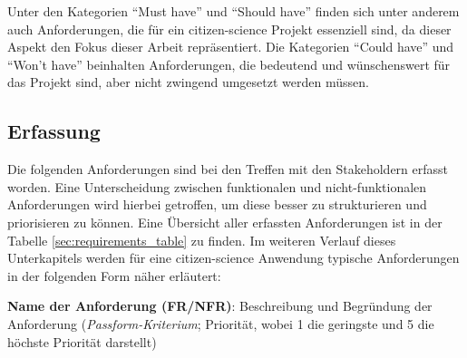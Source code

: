 Unter den Kategorien \enquote{Must have} und \enquote{Should have} finden sich unter anderem auch Anforderungen, die für ein citizen-science Projekt essenziell sind, da dieser Aspekt den Fokus dieser Arbeit repräsentiert. Die Kategorien \enquote{Could have} und \enquote{Won't have} beinhalten Anforderungen, die bedeutend und wünschenswert für das Projekt sind, aber nicht zwingend umgesetzt werden müssen. 

\subsection{Erfassung}
Die folgenden Anforderungen sind bei den Treffen mit den Stakeholdern erfasst worden. Eine Unterscheidung zwischen funktionalen und nicht-funktionalen Anforderungen wird hierbei getroffen, um diese besser zu strukturieren und priorisieren zu können. Eine Übersicht aller erfassten Anforderungen ist in der Tabelle \ref{sec:requirements_table} zu finden. Im weiteren Verlauf dieses Unterkapitels werden für eine citizen-science Anwendung typische Anforderungen in der folgenden Form näher erläutert:

\textbf{Name der Anforderung (FR/NFR)}: Beschreibung und Begründung der Anforderung (\textit{Passform-Kriterium}; Priorität, wobei 1 die geringste und 5 die höchste Priorität darstellt)

